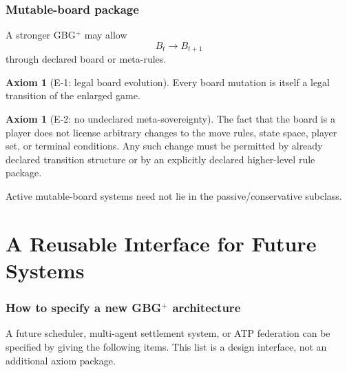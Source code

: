 \documentclass[11pt]{article}
\theoremstyle{definition}
\newtheorem{axiom}[theorem]{Axiom}
\theoremstyle{remark}
\begin{document}
\section{Mutable-board package}

A stronger GBG$^{+}$ may allow
\[
B_t\to B_{t+1}
\]
through declared board or meta-rules.

\begin{axiom}[E-1: legal board evolution]
Every board mutation is itself a legal transition of the enlarged game.
\end{axiom}

\begin{axiom}[E-2: no undeclared meta-sovereignty]
The fact that the board is a player does not license arbitrary changes to the move rules, state space, player set, or terminal conditions.  Any such change must be permitted by already declared transition structure or by an explicitly declared higher-level rule package.
\end{axiom}

Active mutable-board systems need not lie in the passive/conservative subclass.

\part{A Reusable Interface for Future Systems}

\section{How to specify a new \texorpdfstring{GBG$^{+}$}{GBG+} architecture}

A future scheduler, multi-agent settlement system, or ATP federation can be specified by giving the following items.  This list is a design interface, not an additional axiom package.
\end{document}
